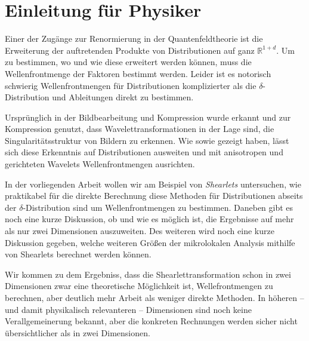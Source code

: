 
\section{Einleitung für Physiker} %
\label{sec:einleitung_physics}
Einer der Zugänge zur Renormierung in der Quantenfeldtheorie ist die Erweiterung der auftretenden Produkte von Distributionen auf ganz $\mathbb{R}^{1+d}$. Um zu bestimmen, wo und wie diese erweitert werden können, muss die Wellenfrontmenge der Faktoren bestimmt werden. Leider ist es notorisch schwierig Wellenfrontmengen für Distributionen komplizierter als die $\delta$-Distribution und Ableitungen direkt zu bestimmen.

Ursprünglich in der Bildbearbeitung und Kompression wurde erkannt und zur Kompression genutzt, dass Wavelettransformationen in der Lage sind, die Singularitätsstruktur von Bildern zu erkennen.
Wie \textcite {Kutyniok2008} sowie \textcite
{Candes2005} gezeigt haben, lässt sich diese Erkenntnis auf Distributionen ausweiten und mit anisotropen und gerichteten Wavelets Wellenfrontmengen ausrichten.

In der vorliegenden Arbeit wollen wir am Beispiel von \emph{Shearlets} untersuchen, wie praktikabel für die direkte Berechnung diese Methoden für Distributionen abseits der $\delta$-Distribution sind um Wellenfrontmengen zu bestimmen. Daneben gibt es noch eine kurze Diskussion, ob und wie es möglich ist, die Ergebnisse auf mehr als nur zwei Dimensionen auszuweiten.
Des weiteren wird noch eine kurze Diskussion gegeben, welche weiteren Größen der mikrolokalen Analysis mithilfe von Shearlets berechnet werden können.

Wir kommen zu dem Ergebniss, dass die Shearlettransformation schon in zwei Dimensionen zwar eine theoretische Möglichkeit ist, Wellefrontmengen zu berechnen, aber deutlich mehr Arbeit als weniger direkte Methoden. In höheren -- und damit physikalisch relevanteren -- Dimensionen sind noch keine Verallgemeinerung bekannt, aber die konkreten Rechnungen werden sicher nicht übersichtlicher als in zwei Dimensionen.


